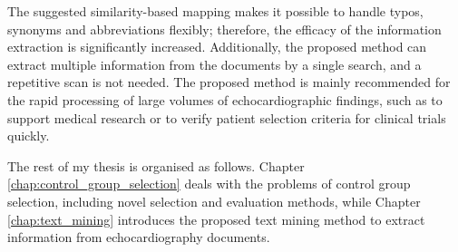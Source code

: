 The suggested similarity-based mapping makes it possible to handle typos, synonyms and abbreviations flexibly; therefore, the efficacy of the information extraction is significantly increased. Additionally, the proposed method can extract multiple information from the documents by a single search, and a repetitive scan is not needed. The proposed method is mainly recommended for the rapid processing of large volumes of echocardiographic findings, such as to support medical research or to verify patient selection criteria for clinical trials quickly.

\vspace{1.0cm}

The rest of my thesis is organised as follows. Chapter \ref{chap:control_group_selection} deals with the problems of control group selection, including novel selection and evaluation methods, while Chapter \ref{chap:text_mining} introduces the proposed text mining method to extract information from echocardiography documents.

